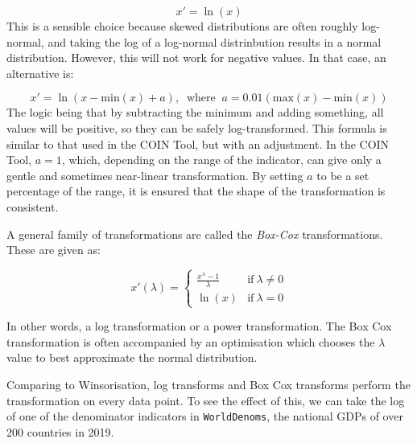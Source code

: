 \documentclass[
]{book}
\newenvironment{Shaded}{\begin{snugshade}}{\end{snugshade}}
\newcommand{\AttributeTok}[1]{\textcolor[rgb]{0.77,0.63,0.00}{#1}}
\newcommand{\CommentTok}[1]{\textcolor[rgb]{0.56,0.35,0.01}{\textit{#1}}}
\newcommand{\FunctionTok}[1]{\textcolor[rgb]{0.00,0.00,0.00}{#1}}
\newcommand{\NormalTok}[1]{#1}
\newcommand{\OtherTok}[1]{\textcolor[rgb]{0.56,0.35,0.01}{#1}}
\newcommand{\SpecialCharTok}[1]{\textcolor[rgb]{0.00,0.00,0.00}{#1}}
\newcommand{\StringTok}[1]{\textcolor[rgb]{0.31,0.60,0.02}{#1}}
\begin{document}
\[ x' = \ln(x) \]
This is a sensible choice because skewed distributions are often roughly log-normal, and taking the log of a log-normal distrinbution results in a normal distribution. However, this will not work for negative values. In that case, an alternative is:

\[ x' = \ln(x- \text{min}(x)+a), \; \; \text{where}\; \; a = 0.01(\text{max}(x)-\text{min}(x)) \]
The logic being that by subtracting the minimum and adding something, all values will be positive, so they can be safely log-transformed. This formula is similar to that used in the COIN Tool, but with an adjustment. In the COIN Tool, \(a=1\), which, depending on the range of the indicator, can give only a gentle and sometimes near-linear transformation. By setting \(a\) to be a set percentage of the range, it is ensured that the shape of the transformation is consistent.

A general family of transformations are called the \emph{Box-Cox} transformations. These are given as:

\[ x'(\lambda) =
    \begin{cases}
      \frac{x^\lambda-1}{\lambda} & \text{if}\ \lambda  \neq 0 \\
      \ln(x) & \text{if}\ \lambda = 0
    \end{cases} \]

In other words, a log transformation or a power transformation. The Box Cox transformation is often accompanied by an optimisation which chooses the \(\lambda\) value to best approximate the normal distribution.

Comparing to Winsorisation, log transforms and Box Cox transforms perform the transformation on every data point. To see the effect of this, we can take the log of one of the denominator indicators in \texttt{WorldDenoms}, the national GDPs of over 200 countries in 2019.

\begin{Shaded}
\end{Shaded}
\end{document}

